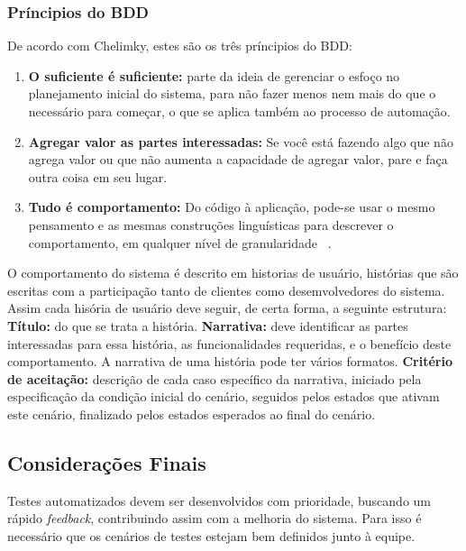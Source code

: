 \subsubsection{Príncipios do BDD}
De acordo com Chelimky, estes são os três príncipios do BDD:
\begin{enumerate}
\item \textbf{O suficiente é suficiente:} parte da ideia de gerenciar o esfoço no 
planejamento inicial do sistema, para não fazer menos nem mais do que o necessário 
para começar, o que se aplica também ao processo de automação.
\item \textbf{Agregar valor as partes interessadas:} Se você está fazendo algo que 
não agrega valor ou que não aumenta a capacidade de agregar valor, pare e faça outra 
coisa em seu lugar.
\item \textbf{Tudo é comportamento:} Do código à aplicação, pode-se usar o mesmo 
pensamento e as mesmas construções linguísticas para descrever o comportamento, em 
qualquer nível de granularidade ~\cite{chelimsky2010}. 
\end{enumerate}
%
O comportamento do sistema é descrito em historias de usuário, histórias que são 
escritas com a participação tanto de clientes como desemvolvedores do sistema. Assim 
cada hisória de usuário deve seguir, de certa forma, a seguinte estrutura:
%
\textbf{Título:} do que se trata a história.
%
\textbf{Narrativa:} deve identificar as partes interessadas para essa história, as 
funcionalidades requeridas, e o benefício deste comportamento. A narrativa de uma 
história pode ter vários formatos.
%
\textbf{Critério de aceitação:} descrição de cada caso específico da narrativa, 
iniciado pela especificação da condição inicial do cenário, seguidos pelos estados 
que ativam este cenário, finalizado pelos estados esperados ao final do cenário.
%

\subsection{Considerações Finais}
Testes automatizados devem ser desenvolvidos com prioridade, buscando um rápido 
\textit{feedback}, contribuindo assim com a melhoria do sistema. Para isso é 
necessário que os cenários de testes estejam bem definidos junto à equipe.
%
